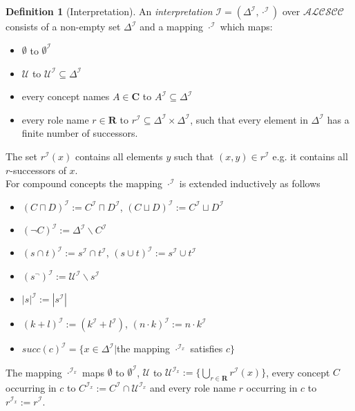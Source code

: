 \documentclass[a4paper,11pt]{scrartcl}
\theoremstyle{break}
\theoremstyle{definition}
\newtheorem{mydef}{Definition}
\begin{document}
\begin{mydef}[Interpretation]
An \textit{interpretation} $\mathcal{I=(\Delta^\mathcal{I},\cdot^\mathcal{I})}$ over $\mathcal{ALCSCC}$ consists of a non-empty set $\Delta^\mathcal{I}$ and a mapping $\cdot^\mathcal{I}$ which maps:
\begin{itemize}
\item $\emptyset$ to $\emptyset^\mathcal{I}$
\item $\mathcal{U}$ to $\mathcal{U}^\mathcal{I}\subseteq \Delta^\mathcal{I}$
\item every concept names $A\in\mathbf{C}$ to $A^\mathcal{I}\subseteq \Delta^\mathcal{I}$
\item every role name $r\in\mathbf{R}$ to $r^\mathcal{I}\subseteq\Delta^\mathcal{I}\times\Delta^\mathcal{I}$, such that every element in $\Delta^\mathcal{I}$ has a finite number of successors.
\end{itemize}
The set $r^\mathcal{I}(x)$ contains all elements $y$ such that $(x,y)\in r^\mathcal{I}$ e.g. it contains all $r$-successors of $x$.\\
For compound concepts the mapping $\cdot^\mathcal{I}$ is extended inductively as follows
\begin{itemize}
\item $(C\sqcap D)^\mathcal{I}:=C^\mathcal{I}\sqcap D^\mathcal{I}$, $(C\sqcup D)^\mathcal{I}:=C^\mathcal{I}\sqcup D^\mathcal{I}$
\item $(\neg C)^\mathcal{I}:=\Delta^\mathcal{I}\backslash C^\mathcal{I}$
\item $(s\cap t)^\mathcal{I}:= s^\mathcal{I}\cap t^\mathcal{I}$, $(s\cup t)^\mathcal{I}:= s^\mathcal{I}\cup t^\mathcal{I}$
\item $(s^\neg)^\mathcal{I}:=\mathcal{U}^\mathcal{I}\backslash s^\mathcal{I}$
\item $|s|^\mathcal{I}:=|s^\mathcal{I}|$
\item $(k+l)^\mathcal{I}:=(k^\mathcal{I}+l^\mathcal{I})$, $(n\cdot k)^\mathcal{I}:= n\cdot k^\mathcal{I}$
\item $succ(c)^\mathcal{I}=\{x\in \Delta^\mathcal{I}|$the mapping $\cdot^{\mathcal{I}_x}$ satisfies $c\}$
\end{itemize}
The mapping $\cdot^{\mathcal{I}_x}$ maps $\emptyset$ to $\emptyset^\mathcal{I}$, $\mathcal{U}$ to $\mathcal{U}^{\mathcal{I}_x}:=\{\bigcup_{r\in\mathbf{R}}r^\mathcal{I}(x)\}$, every concept $C$ occurring in $c$ to $C^{\mathcal{I}_x}:=C^\mathcal{I}\cap \mathcal{U}^{\mathcal{I}_x}$ and every role name $r$ occurring in $c$ to $r^{\mathcal{I}_x}:=r^\mathcal{I}$.\\

\end{mydef}
\end{document}
